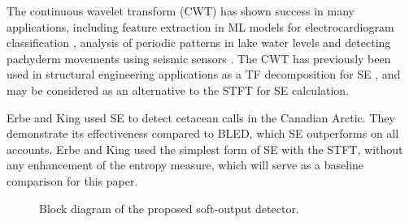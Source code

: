 The continuous wavelet transform (CWT) has shown success in many applications, 
including feature extraction in ML models for electrocardiogram classification \citep{ecgcwt}, 
analysis of periodic patterns in lake water levels \citep{lakelevelcwt} and detecting pachyderm 
movements using seismic sensors \citep{seismiccwt}. The CWT has previously been used in structural 
engineering applications as a TF decomposition for SE \citep{cwtentropy1, cwtentropy2}, and may be 
considered as an alternative to the STFT for SE calculation.

Erbe and King \citep{entropyJASA} used SE to detect  cetacean calls in the Canadian Arctic. They demonstrate its effectiveness compared to BLED, which SE outperforms on all accounts. Erbe and King used the simplest form of SE with the STFT, without any enhancement of the entropy measure, which will serve as a baseline comparison for this paper. 


\begin{figure}[h!]
	\centering
	\caption{Block diagram of the proposed soft-output detector.}\label{fig:systdiag}
\end{figure}

